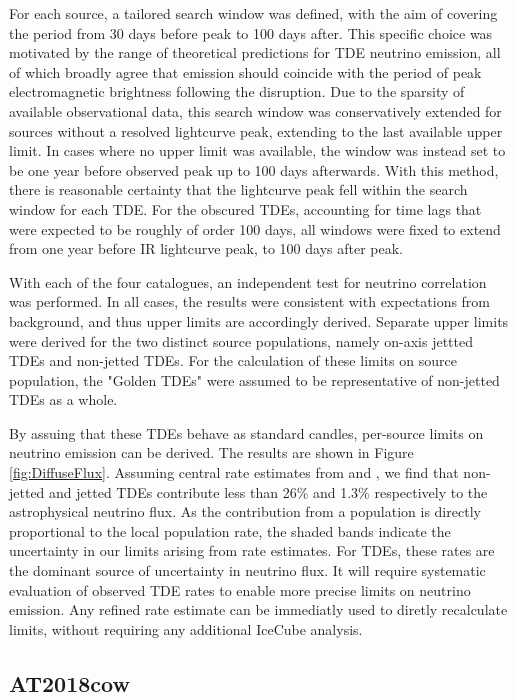 \documentclass{PoS}
\begin{document}
For each source, a tailored search window was defined, with the aim of covering the period from 30 days before peak to 100 days after. This specific choice was motivated by the range of theoretical predictions for TDE neutrino emission, all of which broadly agree that emission should coincide with the period of peak electromagnetic brightness following the disruption. Due to the sparsity of available observational data, this search window was conservatively extended for sources without a resolved lightcurve peak, extending to the last available upper limit. In cases where no upper limit was available, the window was instead set to be one year before observed peak up to 100 days afterwards. With this method, there is reasonable certainty that the lightcurve peak fell within the search window for each TDE. For the obscured TDEs, accounting for time lags that were expected to be roughly of order 100 days, all windows were fixed to extend from one year before IR lightcurve peak, to 100 days after peak.

With each of the four catalogues, an independent test for neutrino correlation was performed. In all cases, the results were consistent with expectations from background, and thus upper limits are accordingly derived. Separate upper limits were derived for the two distinct source populations, namely on-axis jettted TDEs and non-jetted TDEs. For the calculation of these limits on source population, the "Golden TDEs" were assumed to be representative of non-jetted TDEs as a whole. 

By assuing that these TDEs behave as standard candles, per-source limits on neutrino emission can be derived.  The results are shown in Figure \ref{fig:DiffuseFlux}. Assuming central rate estimates from \cite{vanVelzen:2017qum} and \cite{Sun:2015bda}, we find that non-jetted and jetted TDEs contribute less than 26\% and 1.3\% respectively to the astrophysical neutrino flux. As the contribution from a population is directly proportional to the local population rate, the shaded bands indicate the uncertainty in our limits arising from rate estimates. For TDEs, these rates are the dominant source of uncertainty in neutrino flux. It will require systematic evaluation of observed TDE rates to enable more precise limits on neutrino emission. Any refined rate estimate can be immediatly used to diretly recalculate  limits, without requiring any additional IceCube analysis.

\subsection{AT2018cow}
\end{document}

